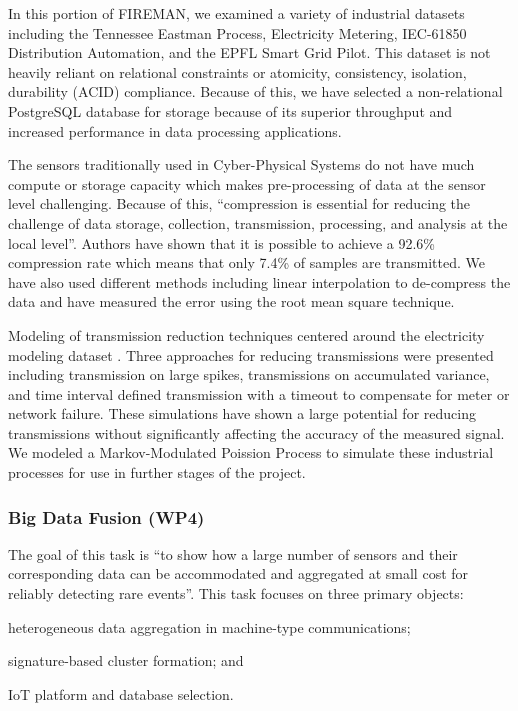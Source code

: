 In this portion of FIREMAN, we examined a  variety of industrial datasets including the Tennessee Eastman Process, Electricity Metering, IEC-61850 Distribution Automation, and the EPFL Smart Grid Pilot. This dataset is not heavily reliant on relational constraints or atomicity, consistency, isolation, durability (ACID) compliance. Because of this, we have selected a non-relational PostgreSQL database for storage because of its superior throughput and increased performance in data processing applications.

The sensors traditionally used in Cyber-Physical Systems do not have much compute or storage capacity which makes pre-processing of data at the sensor level challenging. Because of this, \enquote{compression is essential for reducing the challenge of data storage, collection, transmission, processing, and analysis at the local level}\parencite{compression}. Authors \cite{wp3.2} have shown that it is possible to achieve a 92.6\% compression rate which means that only 7.4\% of samples are transmitted. We have also used different methods including linear interpolation to de-compress the data and have measured the error using the root mean square technique.


Modeling of transmission reduction techniques centered around the electricity modeling dataset \parencite{elect-model-dataset-9694611}. Three approaches for reducing transmissions were presented including transmission on large spikes, transmissions on accumulated variance, and time interval defined transmission with a timeout to compensate for meter or network failure. These simulations have shown a large potential for reducing transmissions without significantly affecting the accuracy of the measured signal. We modeled a Markov-Modulated Poission Process to simulate these industrial processes for use in further stages of the project.

\subsubsection{Big Data Fusion (WP4)}
\label{ref_wp4}
The goal of this task is \enquote{to show how a large number of sensors and their corresponding data can be  accommodated and aggregated at small cost for reliably detecting rare events}\parencite{wp4.1}. This task focuses on three primary objects:
\begin{inlinelist}
    \item heterogeneous data aggregation in machine-type communications;
    \item signature-based cluster formation; and
    \item IoT platform and database selection.
\end{inlinelist}


